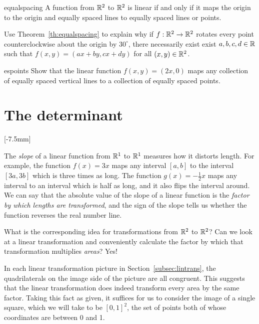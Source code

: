 \documentclass[svgnames]{report}
\begin{document}
\begin{theo}{}{equalspacing}
  A function from $\mathbb{R}^2$ to $\mathbb{R}^2$ is linear if and only if it maps
  the origin to the origin and equally spaced lines to equally spaced
  lines or points.
\end{theo}

\begin{exercise}{}{}
  Use Theorem~\ref{th:equalspacing} to explain why if $f : \mathbb{R}^2 \to
  \mathbb{R}^2$ rotates every point counterclockwise about the origin by $30^\circ$, there
  necessarily exist exist $a,b,c,d\in\mathbb{R}$ such that $f(x,y) = (ax+ by,
  cx+ dy)$ for all $(x,y) \in\mathbb{R}^2$. 
\end{exercise}

\begin{exercise}{}{espoints}
  Show that the linear function $f(x,y)=(2x,0)$ maps any collection of
  equally spaced vertical lines to a collection of equally spaced points.
\end{exercise}

\section{The determinant}

[-7.5mm]

The \textit{slope} of a linear function from $\mathbb{R}^1$ to $\mathbb{R}^1$ measures
how it distorts length. For example, the function $f(x) = 3x$ maps any
interval $[a,b]$ to the interval $[3a,3b]$ which is three times as
long. The function $g(x) = -\tfrac{1}{2}x$ maps any interval to an
interval which is half as long, and it also flips the interval
around. We can say that the absolute value of the slope of a linear
function is the \textit{factor by which lengths are transformed}, and
the sign of the slope tells us whether the function reverses the real
number line.

What is the corresponding idea for transformations from $\mathbb{R}^2$ to
$\mathbb{R}^2$? Can we look at a linear transformation and conveniently
calculate the factor by which that transformation multiplies
\textit{areas}? Yes!

In each linear transformation picture in
Section~\ref{subsec:lintrans}, the quadrilaterals on the image side of
the picture are all congruent. This suggests that the linear
transformation does indeed transform every area by the same
factor. Taking this fact as given, it suffices for us to consider the
image of a single square, which we will take to be $[0,1]^2$, the set
of points both of whose coordinates are between 0 and 1.
\end{document}
